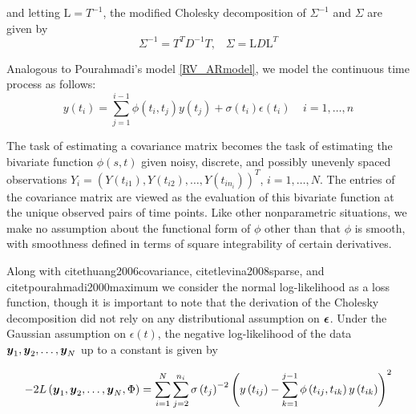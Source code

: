 \documentclass[12pt]{article}
\newcommand{\bfeps}{\mbox{\boldmath $\epsilon$}}
\newcommand{\bfy}{\mbox{\boldmath $y$}}
\theoremstyle{definition}
\begin{document}
\noindent and letting $\text{L} = T^{-1}$, the modified Cholesky decomposition of $\Sigma^{-1}$ and $\Sigma$ are given by 
\[
\Sigma^{-1} = T^T D^{-1}T,\;\;\;\Sigma = \text{L} D \text{L}^T
\]

 Analogous to Pourahmadi's model \eqref{RV_ARmodel}, we model the continuous time process as follows: 
\begin{equation}   
{y}\left(t_i\right)  = \sum_{j=1}^{i-1} \phi\left(t_i ,t_j\right) y\left({t_j}\right) + \sigma\left(t_i\right)\epsilon\left({t_i}\right) \;\;\;\; i=1,\dots, n 
\label{eq:MyModel} 
\end{equation}

The task of estimating a covariance matrix becomes the task of estimating the bivariate function $\phi\left(s,t\right)$ given noisy, discrete, and possibly unevenly spaced observations $Y_i= \left(Y\left(t_{i1}\right),Y\left(t_{i2}\right),\dots,Y\left(t_{i{n_i}}\right)  \right)^T$, $i=1,\dots,N$. The entries of the covariance matrix are viewed as the evaluation of this bivariate function at the unique observed pairs of time points. Like other nonparametric situations, we make no assumption about the functional form of $\phi$ other than that $\phi$ is smooth, with smoothness defined in terms of square integrability of certain derivatives.  


Along with citet{huang2006covariance}, citet{levina2008sparse}, and citet{pourahmadi2000maximum} we consider the normal log-likelihood as a loss function, though it is important to note that the derivation of the Cholesky decomposition did not rely on any distributional assumption on $\bfeps$. Under the Gaussian assumption on $\epsilon\left(t\right)$, the negative log-likelihood of the data $\bfy_1,\bfy_2,\dots, \bfy_N$ up to a constant is given by

\begin{equation}
-2 L\left(\bfy_1, \bfy_2, \dots,\bfy_N ,\Phi \right) = \sum_{i=1}^N \sum_{j=2}^{n_i} \sigma\left({t_j}\right)^{-2} \left(y\left({t_{ij}}\right) - \sum_{k=1}^{j-1}\phi\left({t_{ij},t_{ik}}\right)y\left({t_{ik}}\right) \right)^2 \label{loglikelihood}
\end{equation}


\end{document}
